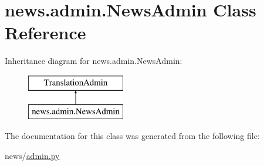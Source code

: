 \hypertarget{classnews_1_1admin_1_1_news_admin}{}\section{news.\+admin.\+News\+Admin Class Reference}
\label{classnews_1_1admin_1_1_news_admin}
Inheritance diagram for news.\+admin.\+News\+Admin\+:\begin{figure}[H]
\begin{center}
\leavevmode
\includegraphics[height=2.000000cm]{classnews_1_1admin_1_1_news_admin}
\end{center}
\end{figure}


The documentation for this class was generated from the following file\+:\begin{DoxyCompactItemize}
\item 
news/\mbox{\hyperlink{admin_8py}{admin.\+py}}\end{DoxyCompactItemize}
